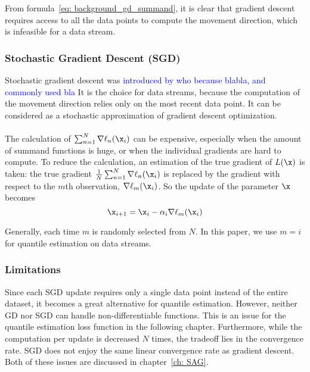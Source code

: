         From formula~\ref{eq: background_gd_summand}, it is clear that gradient descent requires access to all the data points to compute the movement direction, which is infeasible for a data stream.


    \subsubsection{Stochastic Gradient Descent (SGD)}
        Stochastic gradient descent was \textcolor{blue}{introduced by who because blabla, and commonly used bla}
        It is the choice for data streams, because the computation of the movement direction relies only on the most recent data point.
        It can be considered as a stochastic approximation of gradient descent optimization.
        \\\\
        The calculation of $\sum_{n=1}^{N} \nabla \ell_n(\x_i)$ can be
        expensive, especially when the amount of summand functions is huge, or when the individual gradients are hard to
        compute.
        To reduce the calculation, an estimation of the true gradient of $L(\x)$ is taken: 
        the true gradient $\frac{1}{N} \sum_{n=1}^{N} \nabla \ell_n(\x_i)$ is replaced by the gradient with respect to the $m$th observation, $\nabla \ell_m(\x_i)$. 
        So the update of the parameter $\x$ becomes%
        \begin{equation}
            \x_{i+1} = \x_i - \alpha_i \nabla \ell_m(\x_i)
        \end{equation}
        
        Generally, each time $m$ is randomly selected from $N$. In this paper, we use $m = i$ for quantile estimation on data streams.

\subsubsection{Limitations}
Since each SGD update requires only a single data point instead of the entire dataset, it becomes a great alternative for quantile estimation.
However, neither GD nor SGD can handle non-differentiable functions. This is an issue for the quantile estimation loss function in the following chapter.
Furthermore, while the computation per update is decreased $N$ times, the tradeoff lies in the convergence rate. SGD does not enjoy the same linear convergence rate as gradient descent. Both of these issues are discussed in chapter~\ref{ch: SAG}.


